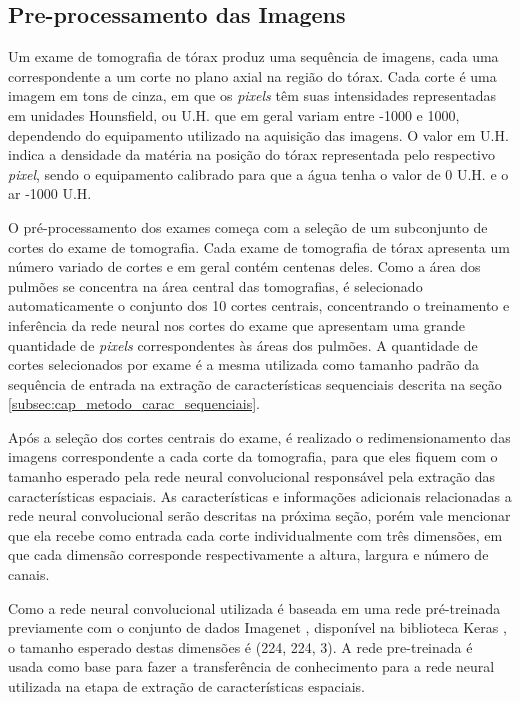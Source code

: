 \subsection{Pre-processamento das Imagens}\label{subsec:cap_metodo_preprocessamento}

Um exame de tomografia de tórax produz uma sequência de imagens, cada uma correspondente a um corte no plano axial na região do tórax. Cada corte é uma imagem em tons de cinza, em que os \textit{pixels} têm suas intensidades representadas em unidades Hounsfield, ou U.H. que em geral variam entre -1000 e 1000, dependendo do equipamento utilizado na aquisição das imagens. O valor em U.H. indica a densidade da matéria na posição do tórax representada pelo respectivo \textit{pixel}, sendo o equipamento calibrado para que a água tenha o valor de 0 U.H. e o ar -1000 U.H.

O pré-processamento dos exames começa com a seleção de um subconjunto de cortes do exame de tomografia. Cada exame de tomografia de tórax apresenta um número variado de cortes e em geral contém centenas deles. Como a área dos pulmões se concentra na área central das tomografias, é selecionado automaticamente o conjunto dos 10 cortes centrais, concentrando o treinamento e inferência da rede neural nos cortes do exame que apresentam uma grande quantidade de \textit{pixels} correspondentes às áreas dos pulmões. A quantidade de cortes selecionados por exame é a mesma utilizada como tamanho padrão da sequência de entrada na extração de características sequenciais descrita na seção \ref{subsec:cap_metodo_carac_sequenciais}.

Após a seleção dos cortes centrais do exame, é realizado o redimensionamento das imagens correspondente a cada corte da tomografia, para que eles fiquem com o tamanho esperado pela rede neural convolucional responsável pela extração das características espaciais. As características e informações adicionais relacionadas a rede neural convolucional serão descritas na próxima seção, porém vale mencionar que ela recebe como entrada cada corte individualmente com três dimensões, em que cada dimensão corresponde respectivamente a altura, largura e número de canais. 

Como a rede neural convolucional utilizada é baseada em uma rede pré-treinada previamente com o conjunto de dados Imagenet \cite{Russakovsky2014}, disponível na biblioteca Keras \cite{chollet2015keras}, o tamanho esperado destas dimensões é (224, 224, 3). A rede pre-treinada é usada como base para fazer a transferência de conhecimento para a rede neural utilizada na etapa de extração de características espaciais.

